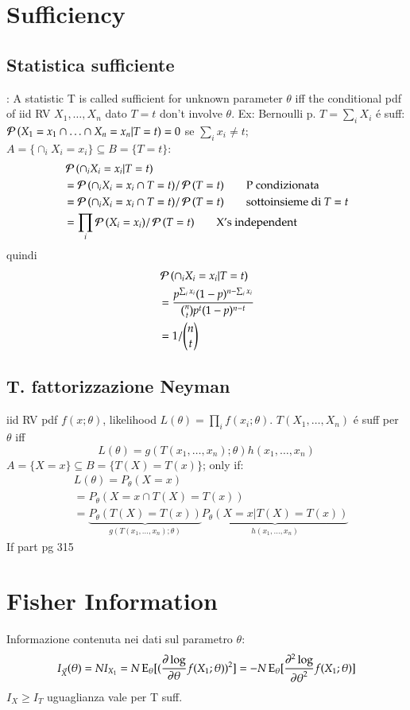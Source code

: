 
\section{Sufficiency}

\subsection{Statistica sufficiente}
: A statistic T is called sufficient for unknown parameter $\theta$ iff the conditional pdf of iid RV $X_1,\ldots,X_n$ dato $T=t$ don't involve $\theta$. Ex:  Bernoulli p. $T=\sum_iX_i$ \'e suff: $\operatorname{\mathcal{P}}{(X_1=x_1\cap\ldots\cap X_n=x_n|T=t)}=0$ se $\sum_ix_i\neq t$; $A=\{\cap_iX_i=x_i\}\subseteq B=\{T=t\}$:
\begin{align*}
&\operatorname{\mathcal{P}}{(\cap_iX_i=x_i|T=t)}\\
&=\operatorname{\mathcal{P}}{(\cap_iX_i=x_i\cap T=t)}/\operatorname{\mathcal{P}}{(T=t)}\tag*{P condizionata}\\
&=\operatorname{\mathcal{P}}{(\cap_iX_i=x_i\cap T=t)}/\operatorname{\mathcal{P}}{(T=t)}\tag*{sottoinsieme di $T=t$}\\
&=\prod_i\operatorname{\mathcal{P}}{(X_i=x_i)}/\operatorname{\mathcal{P}}{(T=t)}\tag*{X's independent}
\end{align*}
quindi
\begin{align*}
&\operatorname{\mathcal{P}}{(\cap_iX_i=x_i|T=t)}\\
&=\frac{p^{\sum_ix_i}(1-p)^{n-\sum_ix_i}}{\binom{n}{t}p^t(1-p)^{n-t}}\\
&=1/\binom{n}{t}
\end{align*}
\subsection{T. fattorizzazione Neyman}
iid RV  pdf $f(x;\theta)$, likelihood $L(\theta)=\prod_if(x_i;\theta)$. $T(X_1,\ldots,X_n)$ \'e suff per $\theta$ iff
\begin{equation*}
L(\theta)=g(T(x_1,\ldots,x_n);\theta)h(x_1,\ldots,x_n)
\end{equation*}
$A=\{X=x\}\subseteq B=\{T(X)=T(x)\}$; only if:
\begin{align*}
&L(\theta)=P_{\theta}(X=x)\\
&=P_{\theta}(X=x\cap T(X)=T(x))\\
&=\underbrace{P_{\theta}(T(X)=T(x))}_{g(T(x_1,\ldots,x_n);\theta)}\underbrace{P_{\theta}(X=x|T(X)=T(x))}_{h(x_1,\ldots,x_n)}
\end{align*}
If part pg 315

\section{Fisher Information}
Informazione contenuta nei dati sul parametro $\theta$:
\[I_{\Vec{X}}(\theta)=NI_{X_1}=N\operatorname{E}_{\theta}[(\frac{\partial \log}{\partial \theta}{f(X_1;\theta)})^2]=-N\operatorname{E}_{\theta}[\frac{\partial^2 \log}{{\partial \theta}^2}{f(X_1;\theta)}]\]
$I_{X}\geq I_T$ uguaglianza vale per T suff.

